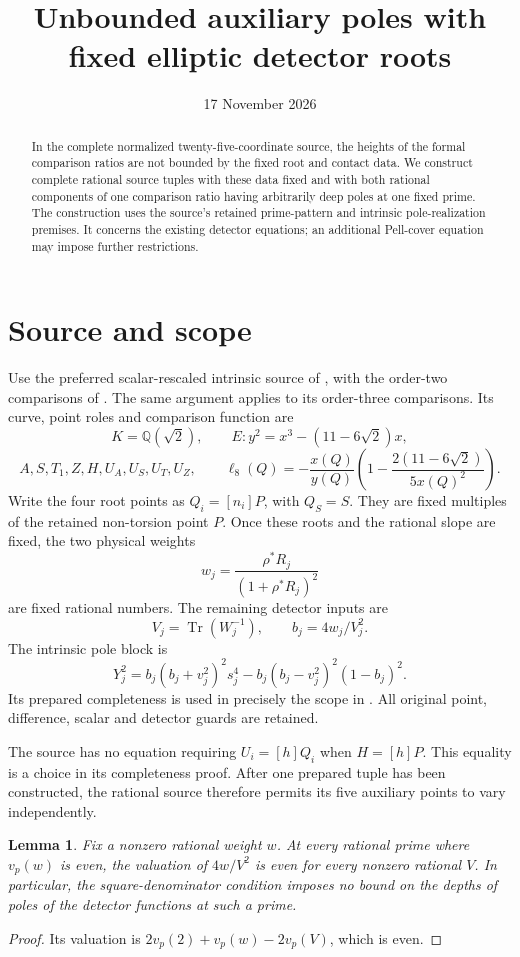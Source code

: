 \documentclass[11pt,a4paper]{article}
\title{Unbounded auxiliary poles with fixed elliptic detector roots}
\author{}\date{17 November 2026}
\newtheorem{lemma}[theorem]{Lemma}
\newcommand{\Q}{\mathbb Q}\newcommand{\Z}{\mathbb Z}
\DeclareMathOperator{\Tr}{Tr}
\begin{document}
\maketitle
\begin{abstract}
In the complete normalized twenty-five-coordinate source, the heights
of the formal comparison ratios are not bounded by the fixed root and
contact data. We construct complete rational source tuples with these
data fixed and with both rational components of one comparison ratio
having arbitrarily deep poles at one fixed prime. The construction uses
the source's retained prime-pattern and intrinsic pole-realization
premises. It concerns the existing detector equations; an additional
Pell-cover equation may impose further restrictions.
\end{abstract}

\section{Source and scope}

Use the preferred scalar-rescaled intrinsic source of
\cite{Scalar}, with the order-two comparisons of \cite{Precision}.
The same argument applies to its order-three comparisons.
Its curve, point roles and comparison function are
\[
 K=\Q(\sqrt2),\qquad E:y^2=x^3-(11-6\sqrt2)x,
\]
\[
 A,S,T_1,Z,H,U_A,U_S,U_T,U_Z,
 \qquad \ell_8(Q)=-\frac{x(Q)}{y(Q)}
       \left(1-\frac{2(11-6\sqrt2)}{5x(Q)^2}\right).
\]
Write the four root points as \(Q_i=[n_i]P\), with
\(Q_S=S\). They are fixed multiples of the retained non-torsion
point \(P\). Once these roots and the rational slope are fixed, the
two physical weights
\[
 w_j=\frac{\rho^*R_j}{(1+\rho^*R_j)^2}
\]
are fixed rational numbers. The remaining detector inputs are
\[
 V_j=\Tr(W_j^{-1}),\qquad b_j=4w_j/V_j^2.
\]
The intrinsic pole block is
\[
 Y_j^2=b_j(b_j+v_j^2)^2s_j^4
          -b_j(b_j-v_j^2)^2(1-b_j)^2.
\]
Its prepared completeness is used in precisely the scope in
\cite{Scalar,Intrinsic}. All original point, difference, scalar and
detector guards are retained.

The source has no equation requiring \(U_i=[h]Q_i\) when
\(H=[h]P\). This equality is a choice in its completeness proof.
After one prepared tuple has been constructed, the rational source
therefore permits its five auxiliary points to vary independently.

\begin{lemma}\label{lem:even}
Fix a nonzero rational weight \(w\). At every rational prime where
\(v_p(w)\) is even, the valuation of \(4w/V^2\) is even for
every nonzero rational \(V\). In particular, the square-denominator
condition imposes no bound on the depths of poles of the detector
functions at such a prime.
\end{lemma}
\begin{proof}
Its valuation is \(2v_p(2)+v_p(w)-2v_p(V)\), which is even.
\end{proof}
\end{document}
